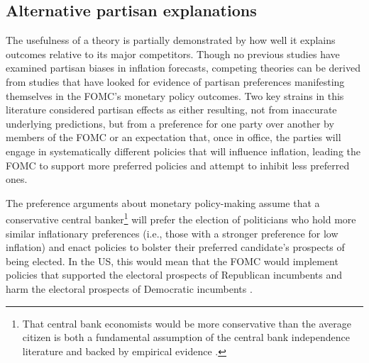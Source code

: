 \documentclass[a4paper]{article}\usepackage[]{graphicx}\usepackage[]{color}
\begin{document}

\subsection{Alternative partisan explanations}

The usefulness of a theory is partially demonstrated by how well it explains outcomes relative to its major competitors. Though no previous studies have examined partisan biases in inflation forecasts, competing theories can be derived from studies that have looked for evidence of partisan preferences manifesting themselves in the FOMC's monetary policy outcomes. Two key strains in this literature considered partisan effects as either resulting, not from inaccurate underlying predictions, but from a preference for one party over another by members of the FOMC or an expectation that, once in office, the parties will engage in systematically different policies that will influence inflation, leading the FOMC to support more preferred policies and attempt to inhibit less preferred ones. 

The preference arguments about monetary policy-making assume that a conservative central banker\footnote{That central bank economists would be more conservative than the average citizen is both a fundamental assumption of the central bank independence literature \citep[e.g.][]{Goodman1991} and backed by empirical evidence \citep[e.g.,][]{Scott1975,Stigler1959}.} will prefer the election of politicians who hold more similar inflationary preferences (i.e., those with a stronger preference for low inflation) and enact policies to bolster their preferred candidate's prospects of being elected. In the US, this would mean that the FOMC would implement policies that supported the electoral prospects of Republican incumbents and harm the electoral prospects of Democratic incumbents \citep{Clark2012,Hakes1988,Sieg1997,Tootell1996}.
\end{document}
